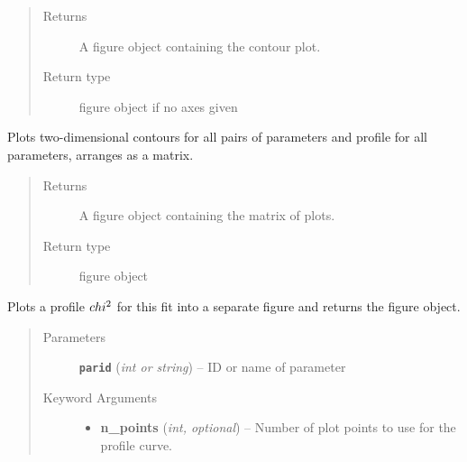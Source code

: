 \documentclass[a4paper,10pt,english]{sphinxmanual}
\begin{document}
\begin{fulllineitems}
\begin{fulllineitems}
\begin{quote}
\begin{description}
\begin{itemize}
\end{itemize}

\item[{Returns}] \leavevmode
A figure object containing the contour plot.

\item[{Return type}] \leavevmode
{} figure object if no axes given

\end{description}\end{quote}

\end{fulllineitems}


\begin{fulllineitems}
\label{module_doc:kafe.fit.Fit.plot_correlations}
Plots two-dimensional contours for all pairs of parameters
and profile for all parameters, arranges as a matrix.
\begin{quote}\begin{description}
\item[{Returns}] \leavevmode
A figure object containing the matrix of plots.

\item[{Return type}] \leavevmode
{} figure object

\end{description}\end{quote}

\end{fulllineitems}


\begin{fulllineitems}
\label{module_doc:kafe.fit.Fit.plot_profile}
Plots a profile \(\\chi^2\) for this fit into
a separate figure and returns the figure object.
\begin{quote}\begin{description}
\item[{Parameters}] \leavevmode
\textbf{\texttt{parid}} (\emph{int or string}) -- ID or name of parameter

\item[{Keyword Arguments}] \leavevmode\begin{itemize}
\item {} 
\textbf{n\_points} (\emph{int, optional}) --
Number of plot points to use for the profile curve.


\end{itemize}
\end{description}
\end{quote}
\end{fulllineitems}
\end{fulllineitems}
\end{document}
